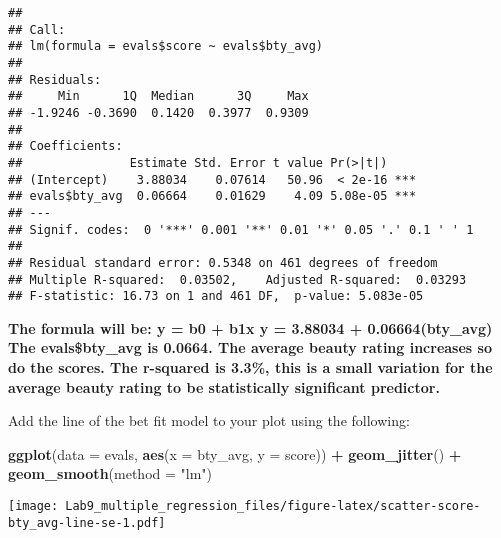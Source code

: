 \documentclass[
]{article}
\newenvironment{Shaded}{\begin{snugshade}}{\end{snugshade}}
\newcommand{\AttributeTok}[1]{\textcolor[rgb]{0.13,0.29,0.53}{#1}}
\newcommand{\FunctionTok}[1]{\textcolor[rgb]{0.13,0.29,0.53}{\textbf{#1}}}
\newcommand{\NormalTok}[1]{#1}
\newcommand{\OtherTok}[1]{\textcolor[rgb]{0.56,0.35,0.01}{#1}}
\newcommand{\SpecialCharTok}[1]{\textcolor[rgb]{0.81,0.36,0.00}{\textbf{#1}}}
\newcommand{\StringTok}[1]{\textcolor[rgb]{0.31,0.60,0.02}{#1}}
\begin{document}
\begin{Shaded}
\end{Shaded}

\begin{verbatim}
## 
## Call:
## lm(formula = evals$score ~ evals$bty_avg)
## 
## Residuals:
##     Min      1Q  Median      3Q     Max 
## -1.9246 -0.3690  0.1420  0.3977  0.9309 
## 
## Coefficients:
##               Estimate Std. Error t value Pr(>|t|)    
## (Intercept)    3.88034    0.07614   50.96  < 2e-16 ***
## evals$bty_avg  0.06664    0.01629    4.09 5.08e-05 ***
## ---
## Signif. codes:  0 '***' 0.001 '**' 0.01 '*' 0.05 '.' 0.1 ' ' 1
## 
## Residual standard error: 0.5348 on 461 degrees of freedom
## Multiple R-squared:  0.03502,    Adjusted R-squared:  0.03293 
## F-statistic: 16.73 on 1 and 461 DF,  p-value: 5.083e-05
\end{verbatim}

\textbf{The formula will be: y = b0 + b1x y = 3.88034 +
0.06664(bty\_avg)} \textbf{The evals\$bty\_avg is 0.0664. The average
beauty rating increases so do the scores. The r-squared is 3.3\%, this
is a small variation for the average beauty rating to be statistically
significant predictor.}

Add the line of the bet fit model to your plot using the following:

\begin{Shaded}
\begin{Highlighting}[]
\FunctionTok{ggplot}\NormalTok{(}\AttributeTok{data =}\NormalTok{ evals, }\FunctionTok{aes}\NormalTok{(}\AttributeTok{x =}\NormalTok{ bty\_avg, }\AttributeTok{y =}\NormalTok{ score)) }\SpecialCharTok{+}
  \FunctionTok{geom\_jitter}\NormalTok{() }\SpecialCharTok{+}
  \FunctionTok{geom\_smooth}\NormalTok{(}\AttributeTok{method =} \StringTok{"lm"}\NormalTok{)}
\end{Highlighting}
\end{Shaded}

\texttt{[image: Lab9\_multiple\_regression\_files/figure-latex/scatter-score-bty\_avg-line-se-1.pdf]}

\begin{Shaded}
\end{Shaded}
\end{document}
